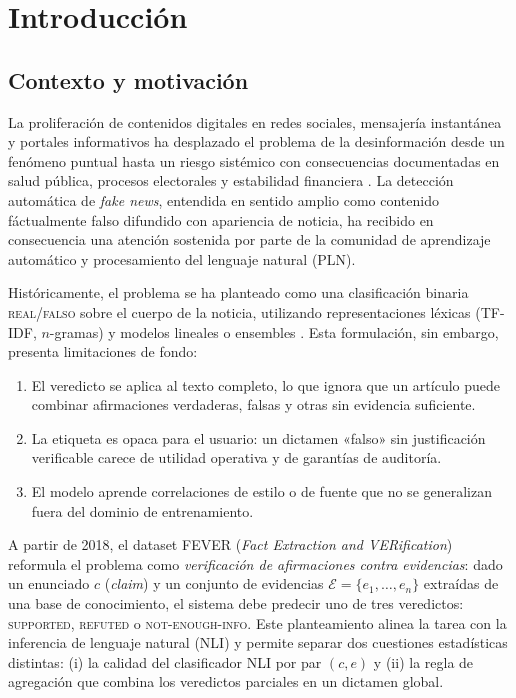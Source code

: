 \chapter{Introducción}\label{cap:introduccion}


\section{Contexto y motivación}

La proliferación de contenidos digitales en redes sociales, mensajería
instantánea y portales informativos ha desplazado el problema de la
desinformación desde un fenómeno puntual hasta un riesgo sistémico con
consecuencias documentadas en salud pública, procesos electorales y
estabilidad financiera \citep{lazer2018science,vosoughi2018spread}. La
detección automática de \emph{fake news}, entendida en sentido amplio como
contenido fáctualmente falso difundido con apariencia de noticia, ha
recibido en consecuencia una atención sostenida por parte de la comunidad
de aprendizaje automático y procesamiento del lenguaje natural (PLN).

Históricamente, el problema se ha planteado como una clasificación binaria
\textsc{real}/\textsc{falso} sobre el cuerpo de la noticia, utilizando
representaciones léxicas (TF-IDF, $n$-gramas) y modelos lineales o
ensembles \citep{conroy2015automatic,shu2017fake}. Esta formulación, sin
embargo, presenta limitaciones de fondo:

\begin{enumerate}[leftmargin=*,itemsep=0.2em]
  \item El veredicto se aplica al texto completo, lo que ignora que un
        artículo puede combinar afirmaciones verdaderas, falsas y otras
        sin evidencia suficiente.
  \item La etiqueta es opaca para el usuario: un dictamen «falso» sin
        justificación verificable carece de utilidad operativa y de
        garantías de auditoría.
  \item El modelo aprende correlaciones de estilo o de fuente que no se
        generalizan fuera del dominio de entrenamiento.
\end{enumerate}

A partir de 2018, el dataset \textsc{FEVER} (\emph{Fact Extraction and
VERification}) \citep{thorne2018fever} reformula el problema como
\emph{verificación de afirmaciones contra evidencias}: dado un enunciado
$c$ (\emph{claim}) y un conjunto de evidencias $\mathcal{E} = \{e_1,
\dots, e_n\}$ extraídas de una base de conocimiento, el sistema debe
predecir uno de tres veredictos: \textsc{supported}, \textsc{refuted} o
\textsc{not-enough-info}. Este planteamiento alinea la tarea con la
inferencia de lenguaje natural (NLI) y permite separar dos cuestiones
estadísticas distintas: (i) la calidad del clasificador NLI por par
$(c, e)$ y (ii) la regla de agregación que combina los veredictos
parciales en un dictamen global.

